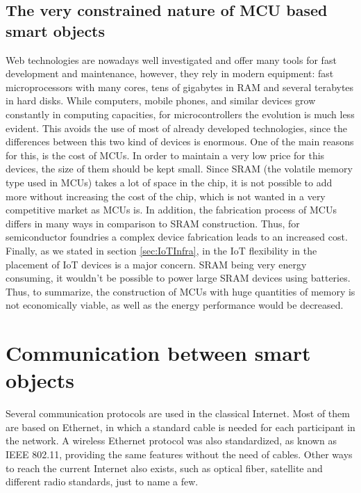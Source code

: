 \subsection{The very constrained nature of MCU based smart objects}
Web technologies are nowadays well investigated and offer many tools for fast development and maintenance, however, they rely in modern equipment: fast microprocessors with many cores, tens of gigabytes in RAM and several terabytes in hard disks.
While computers, mobile phones, and similar devices grow constantly in computing capacities, for microcontrollers the evolution is much less evident.
This avoids the use of most of already developed technologies, since the differences between this two kind of devices is enormous.
One of the main reasons for this, is the cost of MCUs.
In order to maintain a very low price for this devices, the size of them should be kept small.
Since SRAM (the volatile memory type used in MCUs) takes a lot of space in the chip, it is not possible to add more without increasing the cost of the chip, which is not wanted in a very competitive market as MCUs is.
In addition, the fabrication process of MCUs differs in many ways in comparison to SRAM construction.
Thus, for semiconductor foundries a complex device fabrication leads to an increased cost.
Finally, as we stated in section \ref{sec:IoTInfra}, in the IoT flexibility in the placement of IoT devices is a major concern.
SRAM being very energy consuming, it wouldn't be possible to power large SRAM devices using batteries.
Thus, to summarize, the construction of MCUs with huge quantities of memory is not economically viable, as well as the energy performance would be decreased.

\section{Communication between smart objects}
Several communication protocols are used in the classical Internet.
Most of them are based on Ethernet\cite{ieee802.3}, in which a standard cable is needed for each participant in the network.
A wireless Ethernet protocol was also standardized, as known as IEEE 802.11\cite{ieee802.11}, providing the same features without the need of cables.
Other ways to reach the current Internet also exists, such as optical fiber, satellite and different radio standards, just to name a few.

